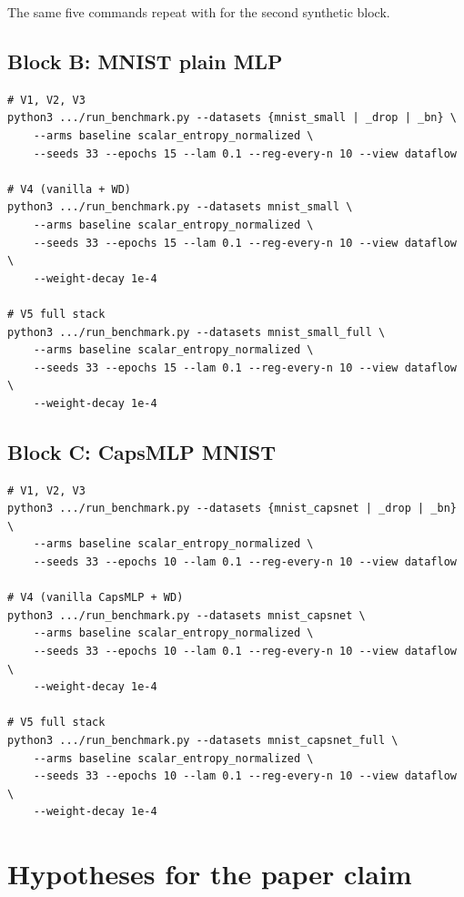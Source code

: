\documentclass[11pt,a4paper]{article}
\newcommand{\code}[1]{\texttt{\detokenize{#1}}}
\begin{document}
The same five commands repeat with \code{--datasets circles*} for the
second synthetic block.

\subsection{Block B: MNIST plain MLP}

\begin{Verbatim}[fontsize=\small,frame=single]
# V1, V2, V3
python3 .../run_benchmark.py --datasets {mnist_small | _drop | _bn} \
    --arms baseline scalar_entropy_normalized \
    --seeds 33 --epochs 15 --lam 0.1 --reg-every-n 10 --view dataflow

# V4 (vanilla + WD)
python3 .../run_benchmark.py --datasets mnist_small \
    --arms baseline scalar_entropy_normalized \
    --seeds 33 --epochs 15 --lam 0.1 --reg-every-n 10 --view dataflow \
    --weight-decay 1e-4

# V5 full stack
python3 .../run_benchmark.py --datasets mnist_small_full \
    --arms baseline scalar_entropy_normalized \
    --seeds 33 --epochs 15 --lam 0.1 --reg-every-n 10 --view dataflow \
    --weight-decay 1e-4
\end{Verbatim}

\subsection{Block C: CapsMLP MNIST}

\begin{Verbatim}[fontsize=\small,frame=single]
# V1, V2, V3
python3 .../run_benchmark.py --datasets {mnist_capsnet | _drop | _bn} \
    --arms baseline scalar_entropy_normalized \
    --seeds 33 --epochs 10 --lam 0.1 --reg-every-n 10 --view dataflow

# V4 (vanilla CapsMLP + WD)
python3 .../run_benchmark.py --datasets mnist_capsnet \
    --arms baseline scalar_entropy_normalized \
    --seeds 33 --epochs 10 --lam 0.1 --reg-every-n 10 --view dataflow \
    --weight-decay 1e-4

# V5 full stack
python3 .../run_benchmark.py --datasets mnist_capsnet_full \
    --arms baseline scalar_entropy_normalized \
    --seeds 33 --epochs 10 --lam 0.1 --reg-every-n 10 --view dataflow \
    --weight-decay 1e-4
\end{Verbatim}

\section{Hypotheses for the paper claim}
\end{document}
